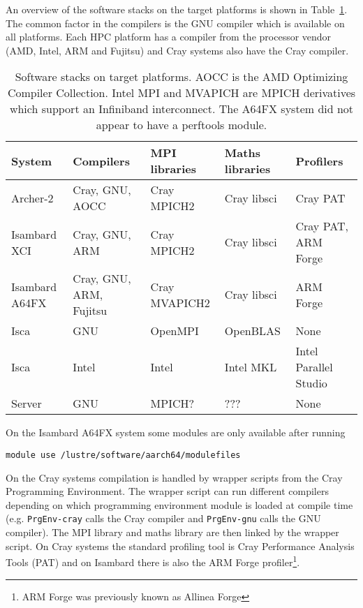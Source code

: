 \documentclass[a4paper,titlepage]{article}
\begin{document}
An overview of the software stacks on the target platforms is shown in Table~\ref{tab:software}. 
The common factor in the compilers is the GNU compiler which is available on all platforms. Each HPC platform has a compiler from the processor vendor (AMD, Intel, ARM and Fujitsu) and Cray systems also have the Cray compiler.
\begin{table}[htp]
\begin{center}
\begin{tabular}{|l|l|l|l|l|}
\hline 
System         & Compilers               & MPI libraries  & Maths libraries & Profilers            \\
\hline
Archer-2       & Cray, GNU, AOCC         & Cray MPICH2     & Cray libsci     & Cray PAT             \\
Isambard XCI   & Cray, GNU, ARM          & Cray MPICH2     & Cray libsci     & Cray PAT, ARM Forge  \\
Isambard A64FX & Cray, GNU, ARM, Fujitsu & Cray MVAPICH2   & Cray libsci     & ARM Forge            \\
Isca           & GNU                     & OpenMPI         & OpenBLAS        & None                  \\
Isca           & Intel                   & Intel           & Intel MKL       & Intel Parallel Studio \\
Server         & GNU                     & MPICH?          & ???             & None                  \\
\hline
\end{tabular}
\end{center}
\caption{Software stacks on target platforms. AOCC is the AMD Optimizing Compiler Collection. Intel MPI and MVAPICH are MPICH derivatives which support an Infiniband interconnect.
The A64FX system did not appear to have a perftools module.}
\label{tab:software}
\end{table}
On the Isambard A64FX system some modules are only available after running 
\begin{verbatim}
module use /lustre/software/aarch64/modulefiles
\end{verbatim}

On the Cray systems compilation is handled by wrapper scripts from the Cray Programming Environment. The wrapper script can run different compilers depending on which programming environment module is loaded at compile time (e.g. \texttt{PrgEnv-cray} calls the Cray compiler and \texttt{PrgEnv-gnu} calls the GNU compiler). The MPI library and maths library are then linked by the wrapper script. On Cray systems the standard profiling tool is Cray Performance Analysis Tools (PAT) and on Isambard there is also the ARM Forge profiler\footnote{ARM Forge was previously known as Allinea Forge}.
\end{document}
